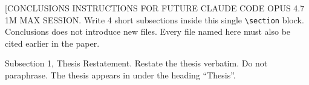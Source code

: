 %
%

\begin{sectionaccent}

[CONCLUSIONS INSTRUCTIONS FOR FUTURE CLAUDE CODE OPUS 4.7 1M MAX
SESSION. Write 4 short subsections inside this single
\texttt{\textbackslash section} block. Conclusions does not introduce new
files. Every file named here must also be cited earlier in the paper.

Subsection 1, Thesis Restatement. Restate the thesis verbatim. Do not
paraphrase. The thesis appears in
 under
the heading ``Thesis''.


\end{sectionaccent}
